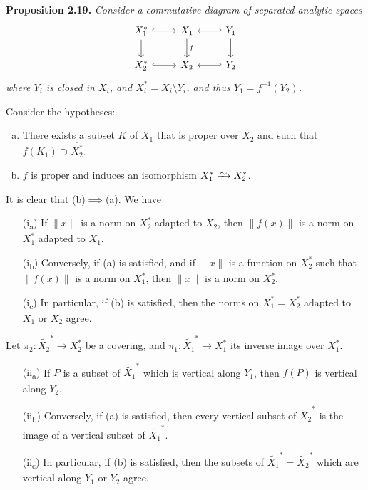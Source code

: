 \documentclass{report}
\newenvironment{itenv}[1]
  {\phantomsection\par\medskip\noindent\textbf{#1.}\itshape}
  {\par\medskip}
\newcommand{\simto}{\xrightarrow{\raisebox{-0.7ex}[0ex][0ex]{$\sim$}}}
\newcommand{\oldpage}[1]{\marginpar{\footnotesize$\Big\vert$ \textit{p.~#1}}}
\begin{document}
\begin{itenv}{Proposition 2.19}
\label{II.2.19}
  Consider a commutative diagram of separated analytic spaces
  \[
    \begin{tikzcd}
      X_1^* \rar[hook] \dar
      & X_1 \dar["f"]
      & Y_1 \lar[hook'] \dar
    \\X_2^* \rar[hook]
      & X_2
      & Y_2 \lar[hook']
    \end{tikzcd}
  \]
  where $Y_i$ is closed in $X_i$, and $X_i^*=X_i\setminus Y_i$, and thus $Y_1=f^{-1}(Y_2)$.

  Consider the hypotheses:
  \begin{enumerate}[(a)]
    \item There exists a subset $K$ of $X_1$ that is proper over $X_2$ and such that $f(K_1)\supset\overline{X_2^*}$.
    \item $f$ is proper and induces an isomorphism $X_1^*\simto X_2^*$.
  \end{enumerate}

  It is clear that \mbox{(b)$\implies$(a)}.
  We have
  \begin{enumerate}
    \item[{\rm(i\textsubscript{a})}] If $\|x\|$ is a norm on $X_2^*$ adapted to $X_2$, then $\|f(x)\|$ is a norm on $X_1^*$ adapted to $X_1$.
\oldpage{69}
    \item[{\rm(i\textsubscript{b})}] Conversely, if {\rm(a)} is satisfied, and if $\|x\|$ is a function on $X_2^*$ such that $\|f(x)\|$ is a norm on $X_1^*$, then $\|x\|$ is a norm on $X_2^*$.
    \item[{\rm(i\textsubscript{c})}] In particular, if {\rm(b)} is satisfied, then the norms on $X_1^*=X_2^*$ adapted to $X_1$ or $X_2$ agree.
  \end{enumerate}

  Let $\pi_2\colon\widetilde{X_2}^*\to X_2^*$ be a covering, and $\pi_1\colon\widetilde{X_1}^*\to X_1^*$ its inverse image over $X_1^*$.
  \begin{enumerate}
    \item[{\rm(ii\textsubscript{a})}] If $P$ is a subset of $\widetilde{X_1}^*$ which is vertical along $Y_1$, then $f(P)$ is vertical along $Y_2$.
    \item[{\rm(ii\textsubscript{b})}] Conversely, if {\rm(a)} is satisfied, then every vertical subset of $\widetilde{X_2}^*$ is the image of a vertical subset of $\widetilde{X_1}^*$.
    \item[{\rm(ii\textsubscript{c})}] In particular, if {\rm(b)} is satisfied, then the subsets of $\widetilde{X_1}^*=\widetilde{X_2}^*$ which are vertical along $Y_1$ or $Y_2$ agree.
  \end{enumerate}


\end{itenv}
\end{document}
